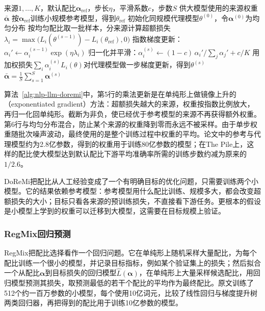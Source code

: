 \begin{algorithm}[DoReMi求解来源权重]
  \label{alg:nlp-llm-doremi}
  \begin{algorithmic}[1]
    \Require 来源$1,\ldots,K$，默认配比$\bm\alpha_{\mathrm{ref}}$，步长$\eta$，平滑系数$c$，步数$S$
    \Ensure 供大模型使用的来源权重$\bar{\bm\alpha}$
    \State 按$\bm\alpha_{\mathrm{ref}}$训练小规模参考模型，得到$\theta_{\mathrm{ref}}$
    \State 初始化同规模代理模型$\theta^{(0)}$，令$\bm\alpha^{(0)}$为均匀分布
      \State 按均匀配比取一批样本，分来源计算超额损失$\lambda_i=\max\bigl(L_i(\theta^{(s-1)})-L_i(\theta_{\mathrm{ref}}),0\bigr)$
      \State 指数梯度更新：$\alpha_i'\gets\alpha_i^{(s-1)}\exp(\eta\lambda_i)$
      \State 归一化并平滑：$\alpha_i^{(s)}\gets(1-c)\,\alpha_i'/\sum_j\alpha_j'+c/K$
      \State 用加权损失$\sum_i\alpha_i^{(s)}L_i(\theta)$对代理模型做一步梯度更新，得到$\theta^{(s)}$
    \EndFor
    \State \Return $\bar{\bm\alpha}=\frac1S\sum_{s=1}^{S}\bm\alpha^{(s)}$
  \end{algorithmic}
\end{algorithm}

算法~\ref{alg:nlp-llm-doremi}中，第5行的乘法更新是在单纯形上做镜像上升的（exponentiated gradient）方法：超额损失越大的来源，权重按指数比例放大，再归一化回单纯形。截断为非负，使已经优于参考模型的来源不再获得额外权重。第6行与均匀分布混合，防止某个来源的权重降到零而永远不被采样。由于单步权重随批次噪声波动，最终使用的是整个训练过程中权重的平均。论文中的参考与代理模型约为2.8亿参数，得到的权重用于训练80亿参数的模型；在The Pile上，这样的配比使大模型达到默认配比下游平均准确率所需的训练步数约减为原来的$1/2.6$。

DoReMi把配比从人工经验变成了一个有明确目标的优化问题，只需要训练两个小模型。它的结果依赖参考模型：参考模型用什么配比训练、规模多大，都会改变超额损失的大小；目标只看各来源的预训练损失，不直接看下游任务。更根本的假设是小模型上学到的权重可以迁移到大模型，这需要在目标规模上验证。

\subsubsection{RegMix回归预测}
\label{sec:nlp-llm-regmix}

RegMix把配比选择看作一个回归问题。它在单纯形上随机采样大量配比，为每个配比训练一个很小的模型，并记录目标指标，例如某个验证集上的损失；然后拟合一个从配比$\bm\alpha$到目标损失的回归模型$\hat L(\bm\alpha)$，在单纯形上大量采样候选配比，用回归模型预测其损失，取预测最低的若干个配比的平均作为最终配比。原文训练了512个约一百万参数的小模型，每个使用10亿词元，比较了线性回归与梯度提升树两类回归器，再把得到的配比用于训练10亿参数的模型。

